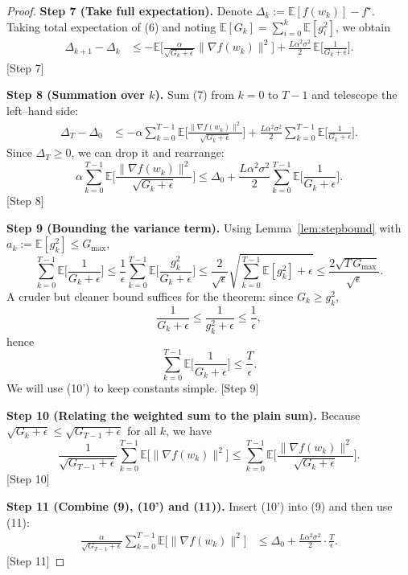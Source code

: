 \documentclass{article}
\newcommand{\E}{\mathbb{E}}
\begin{document}
\begin{proof}
\textbf{Step 7 (Take full expectation).}  
Denote $\Delta_k:=\E[f(w_k)]-f^{\star}$. Taking total expectation of (6) and noting $\E[G_k]=\sum_{i=0}^{k}\E[g_i^{2}]$, we obtain
\begin{align}
\Delta_{k+1}-\Delta_{k}
&\le -\E\!\Big[\frac{\alpha}{\sqrt{G_k+\epsilon}}\|\nabla f(w_k)\|^{2}\Big]
+\frac{L\alpha^{2}\sigma^{2}}{2}\,\E\!\Big[\frac{1}{G_k+\epsilon}\Big]. \tag{7}
\end{align}
[Step 7]

\textbf{Step 8 (Summation over $k$).}  
Sum (7) from $k=0$ to $T-1$ and telescope the left–hand side:
\begin{align}
\Delta_{T}-\Delta_{0}
&\le -\alpha\sum_{k=0}^{T-1}\E\!\Big[\frac{\|\nabla f(w_k)\|^{2}}{\sqrt{G_k+\epsilon}}\Big]
+\frac{L\alpha^{2}\sigma^{2}}{2}\sum_{k=0}^{T-1}\E\!\Big[\frac{1}{G_k+\epsilon}\Big]. \tag{8}
\end{align}
Since $\Delta_{T}\ge0$, we can drop it and rearrange:
\[
\alpha\sum_{k=0}^{T-1}\E\!\Big[\frac{\|\nabla f(w_k)\|^{2}}{\sqrt{G_k+\epsilon}}\Big]
\le \Delta_{0}
+\frac{L\alpha^{2}\sigma^{2}}{2}\sum_{k=0}^{T-1}\E\!\Big[\frac{1}{G_k+\epsilon}\Big]. \tag{9}
\]
[Step 8]

\textbf{Step 9 (Bounding the variance term).}  
Using Lemma~\ref{lem:stepbound} with $a_k:=\E[g_k^{2}]\le G_{\max}$,
\[
\sum_{k=0}^{T-1}\E\!\Big[\frac{1}{G_k+\epsilon}\Big]
\le \frac{1}{\epsilon}\sum_{k=0}^{T-1}\E\!\Big[\frac{g_k^{2}}{G_k+\epsilon}\Big]
\le \frac{2}{\sqrt{\epsilon}}\sqrt{\sum_{k=0}^{T-1}\E[g_k^{2}]+\epsilon}
\le \frac{2\sqrt{T\,G_{\max}}}{\sqrt{\epsilon}}. \tag{10}
\]
A cruder but cleaner bound suffices for the theorem: since $G_k\ge g_k^{2}$,
\[
\frac{1}{G_k+\epsilon}\le\frac{1}{g_k^{2}+\epsilon}\le\frac{1}{\epsilon},
\]
hence
\[
\sum_{k=0}^{T-1}\E\!\Big[\frac{1}{G_k+\epsilon}\Big]\le\frac{T}{\epsilon}. \tag{10'}
\]
We will use (10') to keep constants simple.  
[Step 9]

\textbf{Step 10 (Relating the weighted sum to the plain sum).}  
Because $\sqrt{G_k+\epsilon}\le\sqrt{G_{T-1}+\epsilon}$ for all $k$, we have
\[
\frac{1}{\sqrt{G_{T-1}+\epsilon}}\sum_{k=0}^{T-1}\E\!\big[\|\nabla f(w_k)\|^{2}\big]
\le \sum_{k=0}^{T-1}\E\!\Big[\frac{\|\nabla f(w_k)\|^{2}}{\sqrt{G_k+\epsilon}}\Big]. \tag{11}
\]
[Step 10]

\textbf{Step 11 (Combine (9), (10') and (11)).}  
Insert (10') into (9) and then use (11):
\begin{align}
\frac{\alpha}{\sqrt{G_{T-1}+\epsilon}}\sum_{k=0}^{T-1}\E\!\big[\|\nabla f(w_k)\|^{2}\big]
&\le \Delta_{0}+ \frac{L\alpha^{2}\sigma^{2}}{2}\cdot\frac{T}{\epsilon}. \tag{12}
\end{align}
[Step 11]


\end{proof}
\end{document}
